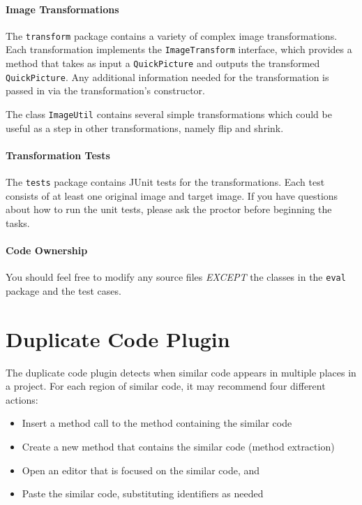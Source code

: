 \documentclass[12pt]{article}
\begin{document}
\paragraph{Image Transformations}

The \verb|transform| package contains a variety of complex image
transformations.  Each transformation implements the
\verb|ImageTransform| interface, which provides a method that takes as
input a \verb|QuickPicture| and outputs the transformed
\verb|QuickPicture|. Any additional information needed for the
transformation is passed in via the transformation's constructor.

The class \verb|ImageUtil| contains several simple transformations
which could be useful as a step in other transformations, namely flip
and shrink.

\paragraph{Transformation Tests}

The \verb|tests| package contains JUnit tests for the
transformations. Each test consists of at least one original image and
target image. If you have questions about how to run the unit tests,
please ask the proctor before beginning the tasks.

\paragraph{Code Ownership}  

You should feel free to modify any source files \textit{EXCEPT} the classes in
the \verb|eval| package and the test cases.

\section{Duplicate Code Plugin}
The duplicate code plugin detects when similar code appears in
multiple places in a project. For each region of similar code, it may
recommend four different actions:

\begin{itemize}
  \item Insert a method call to the method containing the similar code
  \item Create a new method that contains the similar code (method extraction)
  \item Open an editor that is focused on the similar code, and
  \item Paste the similar code, substituting identifiers as needed
\end{itemize}
\end{document}
